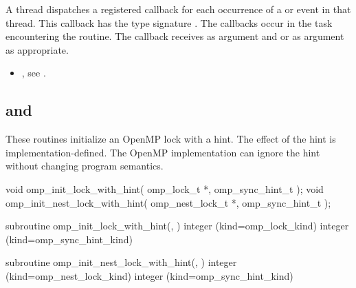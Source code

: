 \tools

A thread dispatches a registered 
callback for each occurrence of a  or  event
in that thread.  This callback has the type signature .
The callbacks occur in the task encountering the routine.
The callback receives  as
 argument and
 or
  as  argument as appropriate.

\crossreferences
\begin{itemize}
\item {}, see
.
\end{itemize}











\subsection[\hcode{omp_init_lock_with_hint} and \\
\hcode{omp_init_nest_lock_with_hint}]{ and \\
}
\label{subsec:omp_init_lock_with_hint and omp_init_nest_lock_with_hint}
\summary
These routines initialize an OpenMP lock with a hint.
The effect of the hint is implementation-defined. The OpenMP implementation
can ignore the hint without changing program semantics.


\format
\begin{ccppspecific}
\begin{ompcFunction}
void omp_init_lock_with_hint(
  omp_lock_t *,
  omp_sync_hint_t 
);
void omp_init_nest_lock_with_hint(
  omp_nest_lock_t *,
  omp_sync_hint_t 
);
\end{ompcFunction}
\end{ccppspecific}


\begin{fortranspecific}
\begin{ompfSubroutine}
subroutine omp_init_lock_with_hint(, )
integer (kind=omp_lock_kind) 
integer (kind=omp_sync_hint_kind) 

subroutine omp_init_nest_lock_with_hint(, )
integer (kind=omp_nest_lock_kind) 
integer (kind=omp_sync_hint_kind) 
\end{ompfSubroutine}
\end{fortranspecific}

